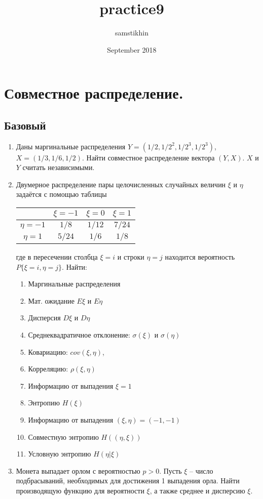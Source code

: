 \documentclass[a4paper, 14pt]{extarticle}
\title{practice9}
\author{samstikhin}
\date{September 2018}
\begin{document}
\section*{Совместное распределение.}
\subsection*{Базовый}
\begin{enumerate}


\item Даны маргинальные распределения $Y = (1/2, 1/2^2, 1/2^3, 1/2^3)$, $X = (1/3,1/6,1/2)$. Найти совместное распределение вектора $(Y,X)$. $X$ и $Y$ считать независимыми.

   \item 
Двумерное распределение пары целочисленных случайных величин $\xi$ и $\eta$ задаётся с помощью таблицы

\begin{center}
\begin{tabular}{|c|c|c|c|}
\hline
 & $\xi = -1$ & $\xi = 0$ & $\xi = 1$\\
\hline
$\eta = -1$ & $1/8$ & $1/12$ & $7/24$\\ 
\hline
$\eta = 1$ & $5/24$ & $1/6$ & $1/8$\\ 
\hline
\end{tabular}

\end{center}
где в пересечении столбца $\xi = i$ и строки $\eta = j$ находится вероятность $P\lbrace{\xi = i, \eta = j\rbrace}$. Найти:

\begin{enumerate}
    \item Маргинальные распределения
    \item Мат. ожидание $E\xi$ и $E\eta$
    \item Дисперсия $D\xi$ и $D\eta$
    \item Среднеквадратичное отклонение: $\sigma(\xi)$ и $\sigma(\eta)$ 
    \item Ковариацию: $cov(\xi, \eta) $,
    \item Корреляцию: $\rho(\xi, \eta)$
    \item Информацию от выпадения $\xi=1$
    \item Энтропию $H(\xi)$
    \item Информацию от выпадения $(\xi,\eta)=(-1,-1)$
    \item Совместную энтропию $H((\eta, \xi))$
    \item Условную энтропию $H(\eta|\xi)$
\end{enumerate}
    
\item Монета выпадает орлом с вероятностью $p>0$. Пусть $\xi$ -- число подбрасываний, необходимых для достижения 1 выпадения орла. Найти производящую функцию для вероятности $\xi$, а также среднее и дисперсию $\xi$.

\end{enumerate}
\end{document}

